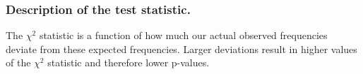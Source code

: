 \subsubsection{Description of the test statistic.}












The $\chi^2$ statistic is a function of how much our actual observed frequencies deviate from these expected frequencies. 
Larger deviations result in higher values of the $\chi^2$ statistic and therefore lower p-values.

